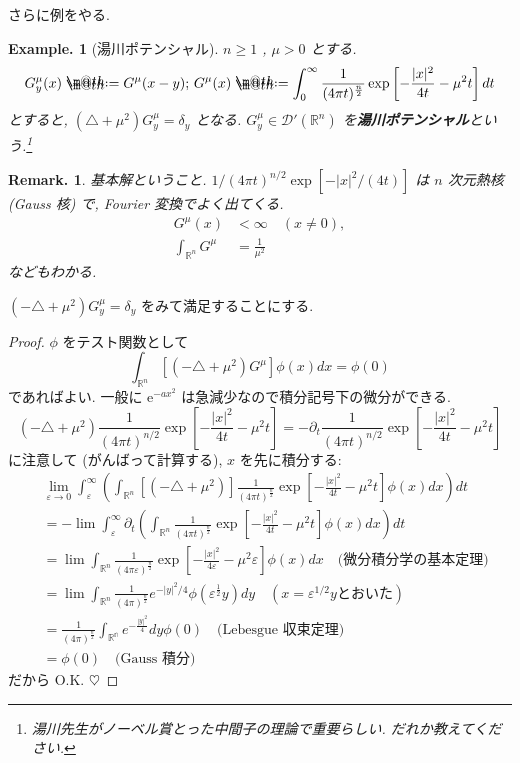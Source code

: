 \documentclass[openany, a4paper, oneside]{book}
\makeatletter
\newcommand*{\defeq}{\mathrel{\rlap{%
\raisebox{0.3ex}{$\m@th\cdot$}}%
\raisebox{-0.3ex}{$\m@th\cdot$}}%
=}
\theoremstyle{break}
\theoremstyle{breakdefn}
\newtheorem{ex}[thm]{Example.}
\newtheorem{rem}[thm]{Remark.}
\newcommand{\abs}[1]{\left|#1\right|}
\newcommand{\rbk}[1]{\left (#1\right)}
\newcommand{\sqbk}[1]{\left[#1\right]}
\makeatother
\begin{document}
さらに例をやる.
\begin{ex}[湯川ポテンシャル]
 $n \ge 1$ ,  $\mu >0$ とする.
 \begin{equation}
 G_y^{\mu}(x)
 \defeq
 G^{\mu}(x - y); \,
 G^{\mu}(x)
 \defeq
 \int_0^{\infty} \frac{1}{(4\pi t)^{\frac{n}{2}}} \exp \sqbk{-\frac{|x|^2}{4t} - \mu^2t} dt
 \end{equation}
 とすると, $(\triangle + \mu^2) G_y^{\mu} = \delta_y$ となる.
 $G_y^{\mu} \in \mathcal{D}'(\mathbb{R}^n)$ を\textbf{湯川ポテンシャル}という.\footnote{湯川先生がノーベル賞とった中間子の理論で重要らしい.
だれか教えてください.
 }
\end{ex}

\begin{rem}
 基本解ということ.
 $1/ (4\pi t)^{n/2}\exp[-|x|^2/ (4t)]$ は $n$ 次元熱核 (Gauss 核) で,
 Fourier 変換でよく出てくる.
 \begin{align}
  G^{\mu}(x)
  &<
  \infty \quad (x \neq 0), \\
  \int_{\mathbb{R}^n}G^{\mu}
  &=
  \frac{1}{\mu^2}
 \end{align}
 などもわかる.
\end{rem}

$(-\triangle + \mu^2) G_y^{\mu} = \delta_y$ をみて満足することにする.
\begin{proof}
$\phi$ をテスト関数として
\begin{equation}
 \int_{\mathbb{R}^n}[(- \triangle + {\mu}^2) G^{\mu}]\phi (x) dx
 =
 \phi (0)
\end{equation}
であればよい.
一般に $\mathrm{e}^{-ax^2}$ は急減少なので積分記号下の微分ができる.
\begin{equation}
 (-\triangle + {\mu}^2)\frac{1}{(4\pi t)^{n/2}} \exp \sqbk{- \frac{|x|^2}{4t} -\mu^2t}
 =
 -\partial_t\frac{1}{(4\pi t)^{n/2}} \exp \sqbk{- \frac{|x|^2}{4t} -\mu^2t}
\end{equation}
に注意して (がんばって計算する), $x$ を先に積分する:
\begin{align}
 &\lim_{\varepsilon \to 0}
  \int_{\varepsilon}^{\infty}
  \rbk{\int_{\mathbb{R}^n}[(-\triangle + \mu^2)] \frac{1}{(4\pi t)^{\frac{n}{2}}} \exp \sqbk{- \frac{|x|^2}{4t} -\mu^2t}
  \phi (x) dx} dt \\
 &=
 -\lim \int_{\varepsilon}^{\infty}\partial_t
  \rbk{\int_{\mathbb{R}^n}\frac{1}{(4\pi t)^{\frac{n}{2}}} \exp \sqbk{- \frac{|x|^2}{4t} -\mu^2t} \phi (x) dx} dt \\
 &=
 \lim \int_{\mathbb{R}^n}
  \frac{1}{(4\pi \varepsilon)^{\frac{n}{2}}}
  \exp \sqbk{- \frac{|x|^2}{4 \varepsilon} -\mu^2 \varepsilon}
  \phi (x) dx \quad \text{(微分積分学の基本定理)} \\
 &=
 \lim \int_{\mathbb{R}^n}
  \frac{1}{(4\pi)^{\frac{n}{2}}}
  e^{- \abs{y}^2 / 4}
  \phi (\varepsilon^{\frac{1}{2}}y) dy \quad (x = \varepsilon^{1/2}y \text{とおいた}) \\
 &=
 \frac{1}{(4\pi)^{\frac{n}{2}}}\int_{\mathbb{R^n}}e^{- \frac{|y|^2}{4}}dy\phi (0) \quad \text{(Lebesgue 収束定理)} \\
 &= \phi (0) \quad \text{(Gauss 積分)}
\end{align}
だから O.K.
$\heartsuit$
\end{proof}
\end{document}
